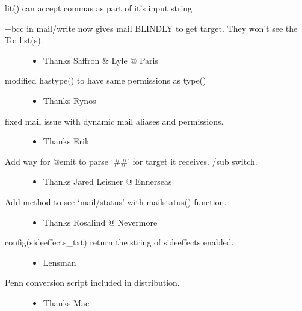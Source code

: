 \documentclass[letterpaper,10pt,english]{sphinxmanual}
\begin{document}
\sphinxAtStartPar
lit() can accept commas as part of it’s input string
\begin{description}
\item[{+bcc in mail/write now gives mail BLINDLY to get target. They won’t see the To: list(s).}] \leavevmode\begin{itemize}
\item {} 
\sphinxAtStartPar
Thanks Saffron \& Lyle @ Paris

\end{itemize}

\item[{modified hastype() to have same permissions as type()}] \leavevmode\begin{itemize}
\item {} 
\sphinxAtStartPar
Thanks Rynos

\end{itemize}

\item[{fixed mail issue with dynamic mail aliases and permissions.}] \leavevmode\begin{itemize}
\item {} 
\sphinxAtStartPar
Thanks Erik

\end{itemize}

\item[{Add way for @emit to parse ‘\#\#’ for target it receives.  /sub switch.}] \leavevmode\begin{itemize}
\item {} 
\sphinxAtStartPar
Thanks Jared Leisner @ Ennerseas

\end{itemize}

\item[{Add method to see ‘mail/status’ with mailstatus() function.}] \leavevmode\begin{itemize}
\item {} 
\sphinxAtStartPar
Thanks Rosalind @ Nevermore

\end{itemize}

\item[{config(sideeffects\_txt) return the string of sideeffects enabled.}] \leavevmode\begin{itemize}
\item {} 
\sphinxAtStartPar
Lensman

\end{itemize}

\item[{Penn conversion script included in distribution.}] \leavevmode\begin{itemize}
\item {} 
\sphinxAtStartPar
Thanks Mac


\end{itemize}
\end{description}
\end{document}
